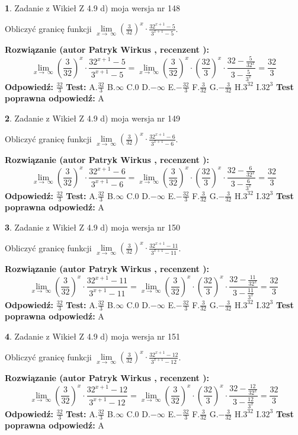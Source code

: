 \documentclass[12pt, a4paper]{article}
\theoremstyle{definition} %
\newtheorem{zad}{}
\newcommand{\zadStart}[1]{\begin{zad}#1\newline}
\newcommand{\zadStop}{\end{zad}}
\newcommand{\rozwStart}[2]{\noindent \textbf{Rozwiązanie (autor #1 , recenzent #2): }\newline}
\newcommand{\rozwStop}{\newline}
\newcommand{\odpStart}{\noindent \textbf{Odpowiedź:}\newline}
\newcommand{\odpStop}{\newline}
\newcommand{\testStart}{\noindent \textbf{Test:}\newline}
\newcommand{\testStop}{\newline}
\newcommand{\kluczStart}{\noindent \textbf{Test poprawna odpowiedź:}\newline}
\newcommand{\kluczStop}{\newline}
\begin{document}
\zadStart{Zadanie z Wikieł Z 4.9 d) moja wersja nr 148}


Obliczyć granicę funkcji  $\lim\limits_{x\to\ \infty}(\frac{3}{32})^{x}\cdot\frac{32^{x+1}-5}{3^{x+1}-5}$.
\zadStop
\rozwStart{Patryk Wirkus}{}
$$\lim\limits_{x\to\ \infty}(\frac{3}{32})^{x}\cdot\frac{32^{x+1}-5}{3^{x+1}-5}=\lim\limits_{x\to\ \infty}(\frac{3}{32})^{x}\cdot(\frac{32}{3})^{x} \cdot \frac{32-\frac{5}{32^{x}}}{3-\frac{5}{3^{x}}} = \frac{32}{3}$$
\rozwStop
\odpStart
$\frac{32}{3}$
\odpStop
\testStart
A.$\frac{32}{3}$ B.$\infty$ C.$0$ D.$-\infty$ E.$-\frac{32}{3}$
F.$\frac{3}{32}$ G.$-\frac{3}{32}$
H.$3^{32}$
I.$32^{3}$
\testStop
\kluczStart
A
\kluczStop



\zadStart{Zadanie z Wikieł Z 4.9 d) moja wersja nr 149}


Obliczyć granicę funkcji  $\lim\limits_{x\to\ \infty}(\frac{3}{32})^{x}\cdot\frac{32^{x+1}-6}{3^{x+1}-6}$.
\zadStop
\rozwStart{Patryk Wirkus}{}
$$\lim\limits_{x\to\ \infty}(\frac{3}{32})^{x}\cdot\frac{32^{x+1}-6}{3^{x+1}-6}=\lim\limits_{x\to\ \infty}(\frac{3}{32})^{x}\cdot(\frac{32}{3})^{x} \cdot \frac{32-\frac{6}{32^{x}}}{3-\frac{6}{3^{x}}} = \frac{32}{3}$$
\rozwStop
\odpStart
$\frac{32}{3}$
\odpStop
\testStart
A.$\frac{32}{3}$ B.$\infty$ C.$0$ D.$-\infty$ E.$-\frac{32}{3}$
F.$\frac{3}{32}$ G.$-\frac{3}{32}$
H.$3^{32}$
I.$32^{3}$
\testStop
\kluczStart
A
\kluczStop



\zadStart{Zadanie z Wikieł Z 4.9 d) moja wersja nr 150}


Obliczyć granicę funkcji  $\lim\limits_{x\to\ \infty}(\frac{3}{32})^{x}\cdot\frac{32^{x+1}-11}{3^{x+1}-11}$.
\zadStop
\rozwStart{Patryk Wirkus}{}
$$\lim\limits_{x\to\ \infty}(\frac{3}{32})^{x}\cdot\frac{32^{x+1}-11}{3^{x+1}-11}=\lim\limits_{x\to\ \infty}(\frac{3}{32})^{x}\cdot(\frac{32}{3})^{x} \cdot \frac{32-\frac{11}{32^{x}}}{3-\frac{11}{3^{x}}} = \frac{32}{3}$$
\rozwStop
\odpStart
$\frac{32}{3}$
\odpStop
\testStart
A.$\frac{32}{3}$ B.$\infty$ C.$0$ D.$-\infty$ E.$-\frac{32}{3}$
F.$\frac{3}{32}$ G.$-\frac{3}{32}$
H.$3^{32}$
I.$32^{3}$
\testStop
\kluczStart
A
\kluczStop



\zadStart{Zadanie z Wikieł Z 4.9 d) moja wersja nr 151}


Obliczyć granicę funkcji  $\lim\limits_{x\to\ \infty}(\frac{3}{32})^{x}\cdot\frac{32^{x+1}-12}{3^{x+1}-12}$.
\zadStop
\rozwStart{Patryk Wirkus}{}
$$\lim\limits_{x\to\ \infty}(\frac{3}{32})^{x}\cdot\frac{32^{x+1}-12}{3^{x+1}-12}=\lim\limits_{x\to\ \infty}(\frac{3}{32})^{x}\cdot(\frac{32}{3})^{x} \cdot \frac{32-\frac{12}{32^{x}}}{3-\frac{12}{3^{x}}} = \frac{32}{3}$$
\rozwStop
\odpStart
$\frac{32}{3}$
\odpStop
\testStart
A.$\frac{32}{3}$ B.$\infty$ C.$0$ D.$-\infty$ E.$-\frac{32}{3}$
F.$\frac{3}{32}$ G.$-\frac{3}{32}$
H.$3^{32}$
I.$32^{3}$
\testStop
\kluczStart
A
\kluczStop
\end{document}
